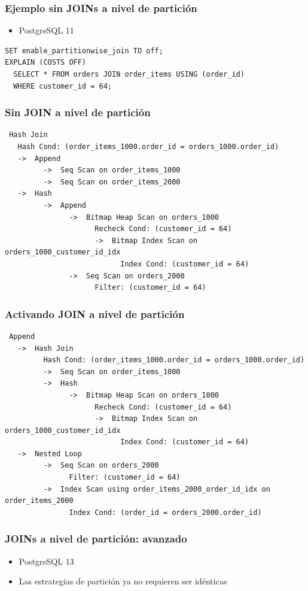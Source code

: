 \documentclass[ignorenonframetext,t]{beamer}
\begin{document}
\begin{frame}[fragile]
	\frametitle{Ejemplo sin JOINs a nivel de partición}

\begin{itemize} \item PostgreSQL 11 \end{itemize}
\footnotesize
  \begin{lstlisting}
SET enable_partitionwise_join TO off;
EXPLAIN (COSTS OFF)
  SELECT * FROM orders JOIN order_items USING (order_id)
  WHERE customer_id = 64;
  \end{lstlisting}
\end{frame}
\begin{frame}[fragile]
	\frametitle{Sin JOIN a nivel de partición}
	\begin{lstlisting}
 Hash Join
   Hash Cond: (order_items_1000.order_id = orders_1000.order_id)
   ->  Append
         ->  Seq Scan on order_items_1000
         ->  Seq Scan on order_items_2000
   ->  Hash
         ->  Append
               ->  Bitmap Heap Scan on orders_1000
                     Recheck Cond: (customer_id = 64)
                     ->  Bitmap Index Scan on orders_1000_customer_id_idx
                           Index Cond: (customer_id = 64)
               ->  Seq Scan on orders_2000
                     Filter: (customer_id = 64)
  \end{lstlisting}
\end{frame}

\begin{frame}[fragile]
	\frametitle{Activando JOIN a nivel de partición}

\scriptsize
  \begin{lstlisting}
 Append
   ->  Hash Join
         Hash Cond: (order_items_1000.order_id = orders_1000.order_id)
         ->  Seq Scan on order_items_1000
         ->  Hash
               ->  Bitmap Heap Scan on orders_1000
                     Recheck Cond: (customer_id = 64)
                     ->  Bitmap Index Scan on orders_1000_customer_id_idx
                           Index Cond: (customer_id = 64)
   ->  Nested Loop
         ->  Seq Scan on orders_2000
               Filter: (customer_id = 64)
         ->  Index Scan using order_items_2000_order_id_idx on order_items_2000
               Index Cond: (order_id = orders_2000.order_id)
  \end{lstlisting}

\end{frame}

\begin{frame}
	\frametitle{JOINs a nivel de partición: avanzado}

	\begin{itemize}
		\item PostgreSQL 13
		\item Las estrategias de partición ya no requieren ser idénticas
	\end{itemize}
\end{frame}
\end{document}

